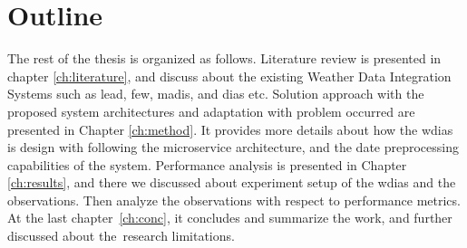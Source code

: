 \section{Outline}
The rest of the thesis is organized as follows. Literature review is presented in chapter \ref{ch:literature}, and discuss about the existing Weather Data Integration Systems such as \acrshort{lead}, \acrshort{few}, \acrshort{madis}, and \acrshort{dias} etc. Solution approach with the proposed system architectures and adaptation with problem occurred are presented in Chapter \ref{ch:method}. It provides more details about how the \acrshort{wdias} is design with following the microservice architecture, and the date preprocessing capabilities of the system. Performance analysis is presented in Chapter \ref{ch:results}, and there we discussed about experiment setup of the \acrshort{wdias} and the observations. Then analyze the observations with respect to performance metrics. At the last chapter \ref{ch:conc}, it concludes and summarize the work, and further discussed about the research limitations.
